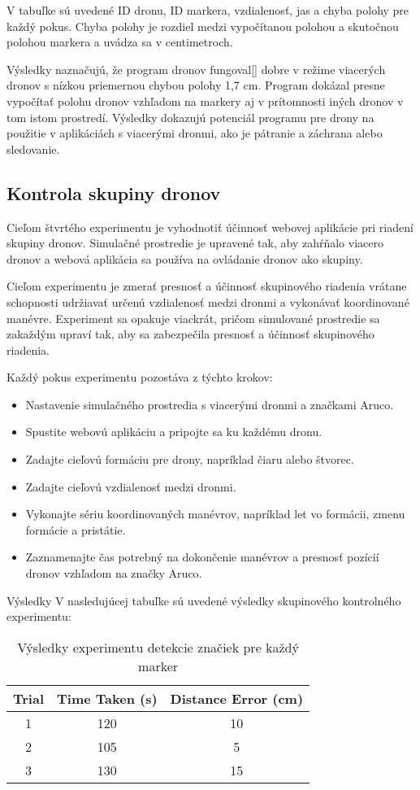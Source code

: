 V tabuľke sú uvedené ID dronu, ID markera, vzdialenosť, jas a chyba polohy pre každý pokus. Chyba polohy je rozdiel medzi vypočítanou polohou a skutočnou polohou markera a uvádza sa v centimetroch.

Výsledky naznačujú, že program dronov fungoval[] dobre v režime viacerých dronov s nízkou priemernou chybou polohy 1,7 cm. Program dokázal presne vypočítať polohu dronov vzhľadom na markery aj v prítomnosti iných dronov v tom istom prostredí. Výsledky dokazujú potenciál programu pre drony na použitie v aplikáciách s viacerými dronmi, ako je pátranie a záchrana alebo sledovanie.

\subsection{Kontrola skupiny dronov}
Cieľom štvrtého experimentu je vyhodnotiť účinnosť webovej aplikácie pri riadení skupiny dronov. Simulačné prostredie je upravené tak, aby zahŕňalo viacero dronov a webová aplikácia sa používa na ovládanie dronov ako skupiny.

Cieľom experimentu je zmerať presnosť a účinnosť skupinového riadenia vrátane schopnosti udržiavať určenú vzdialenosť medzi dronmi a vykonávať koordinované manévre. Experiment sa opakuje viackrát, pričom simulované prostredie sa zakaždým upraví tak, aby sa zabezpečila presnosť a účinnosť skupinového riadenia.

Každý pokus experimentu pozostáva z týchto krokov:

\begin{itemize}
    \item  Nastavenie simulačného prostredia s viacerými dronmi a značkami Aruco.
    \item  Spustite webovú aplikáciu a pripojte sa ku každému dronu.
    \item  Zadajte cieľovú formáciu pre drony, napríklad čiaru alebo štvorec.
    \item  Zadajte cieľovú vzdialenosť medzi dronmi.
    \item  Vykonajte sériu koordinovaných manévrov, napríklad let vo formácii, zmenu formácie a pristátie.
    \item  Zaznamenajte čas potrebný na dokončenie manévrov a presnosť pozícií dronov vzhľadom na značky Aruco.
\end{itemize}

Výsledky
V nasledujúcej tabuľke sú uvedené výsledky skupinového kontrolného experimentu:

\begin{table}[h!] 
    \centering
        \begin{tabular}{|c | c | c|} 
        \hline
        Trial & Time Taken (s) & Distance Error (cm) \\ [0.5ex] 
        \hline\hline
        1 & 120 & 10 \\ 
        \hline
        2 & 105 & 5 \\ 
        \hline
        3 & 130 & 15 \\ 
        \hline
       \end{tabular}
       \caption{Výsledky experimentu detekcie značiek pre každý marker}
        \label{table:1}
\end{table}

